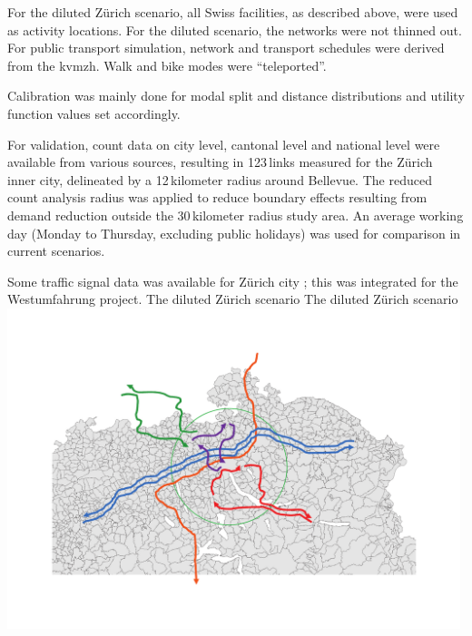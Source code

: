For the diluted Zürich scenario, all Swiss facilities, as described above, were used as activity locations. For the diluted scenario, the networks were not thinned out. For  public transport simulation, network and transport schedules were derived from the \gls{kvmzh}. Walk and bike modes were ``teleported''. 

Calibration was mainly done for modal split and distance distributions and utility function values set accordingly.

For validation, count data on city level, cantonal level and national level \citep[][]{ASTRA_Webpage_2006} were available from various sources, resulting in 123\,links measured for the Zürich inner city, delineated by a 12\,kilometer radius around Bellevue. The reduced count analysis radius was applied to reduce boundary effects resulting from demand reduction outside the 30\,kilometer radius study area. An average working day (Monday to Thursday, excluding public holidays) was used for comparison in current scenarios.

Some traffic signal data was available for Zürich city \citep[][]{STAPOZH-DAV_unpub_gtZH_2008}; this was integrated for the Westumfahrung project.
%
\createfigure%
{The diluted Zürich scenario}%
{The diluted Zürich scenario}%
{\label{fig:zurichScenario}}%
{\includegraphics[width=0.99\textwidth, angle=0]{scenarios/figures/zh.pdf}}%
{}

